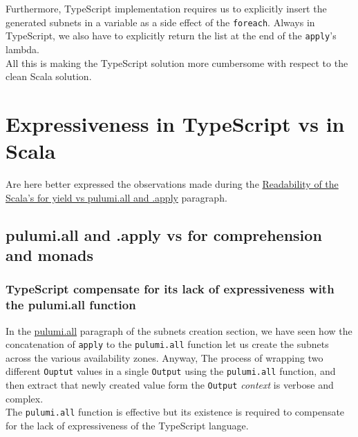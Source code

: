 Furthermore, TypeScript implementation requires us to explicitly insert the generated subnets in a variable as a side effect of the \texttt{foreach}.
Always in TypeScript, we also have to explicitly return the list at the end of the \texttt{apply}'s lambda.\\
All this is making the TypeScript solution more cumbersome with respect to the clean Scala solution.


\section{Expressiveness in TypeScript vs in Scala}
Are here better expressed the observations made during the \hyperref[sssec:readability-for-yield]{Readability of the Scala's for yield vs pulumi.all and .apply} paragraph.

\subsection{pulumi.all and .apply vs for comprehension and monads}

\subsubsection{TypeScript compensate for its lack of expressiveness with the pulumi.all function}
In the \hyperref[sssec:pulumi-all]{pulumi.all} paragraph of the subnets creation section, we have seen how the concatenation of \texttt{apply} to the \texttt{pulumi.all} function let us create the subnets across the various availability zones.
Anyway, The process of wrapping two different \texttt{Ouptut} values in a single \texttt{Output} using the \texttt{pulumi.all} function, and then extract that newly created value form the \texttt{Output} \textit{context} is verbose and complex.\\
The \texttt{pulumi.all} function is effective but its existence is required to compensate for the lack of expressiveness of the TypeScript language.


